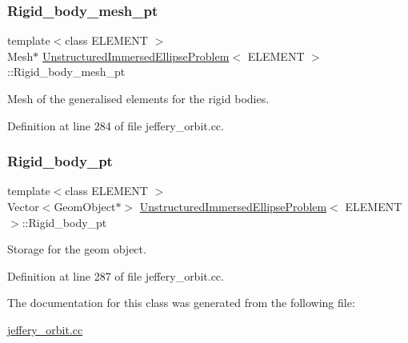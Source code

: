 \subsubsection{\texorpdfstring{Rigid\+\_\+body\+\_\+mesh\+\_\+pt}{Rigid\_body\_mesh\_pt}}
{\footnotesize\ttfamily template$<$class E\+L\+E\+M\+E\+NT $>$ \\
Mesh$\ast$ \hyperlink{classUnstructuredImmersedEllipseProblem}{Unstructured\+Immersed\+Ellipse\+Problem}$<$ E\+L\+E\+M\+E\+NT $>$\+::Rigid\+\_\+body\+\_\+mesh\+\_\+pt\hspace{0.3cm}{\ttfamily [private]}}



Mesh of the generalised elements for the rigid bodies. 



Definition at line 284 of file jeffery\+\_\+orbit.\+cc.

\mbox{\label{classUnstructuredImmersedEllipseProblem_aaa6d1c19f3634a6f08f3dd7e5046217e}} 
\subsubsection{\texorpdfstring{Rigid\+\_\+body\+\_\+pt}{Rigid\_body\_pt}}
{\footnotesize\ttfamily template$<$class E\+L\+E\+M\+E\+NT $>$ \\
Vector$<$Geom\+Object$\ast$$>$ \hyperlink{classUnstructuredImmersedEllipseProblem}{Unstructured\+Immersed\+Ellipse\+Problem}$<$ E\+L\+E\+M\+E\+NT $>$\+::Rigid\+\_\+body\+\_\+pt\hspace{0.3cm}{\ttfamily [private]}}



Storage for the geom object. 



Definition at line 287 of file jeffery\+\_\+orbit.\+cc.



The documentation for this class was generated from the following file\+:\begin{DoxyCompactItemize}
\item 
\hyperlink{jeffery__orbit_8cc}{jeffery\+\_\+orbit.\+cc}\end{DoxyCompactItemize}
